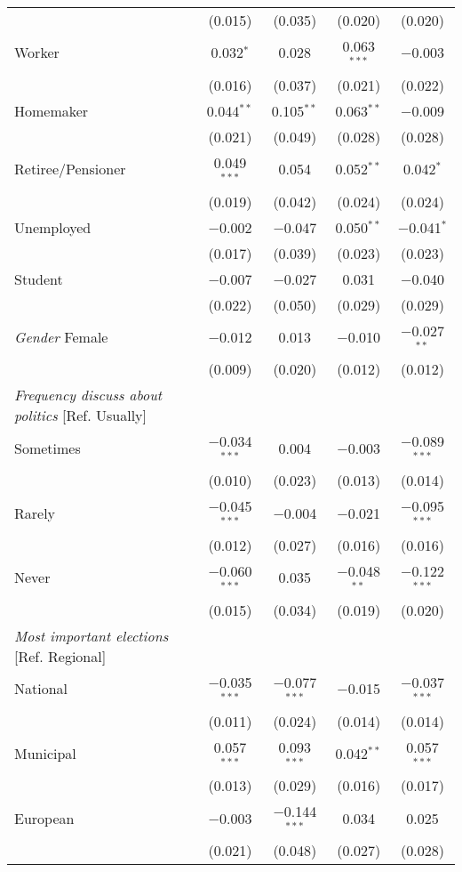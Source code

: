 \documentclass[12pt,a4paper]{article}
\begin{document}
\begin{scriptsize}
\begin{longtable}{@{\extracolsep{5pt}}lcccc}
  & (0.015) & (0.035) & (0.020) & (0.020) \\ 
Worker & 0.032$^{*}$ & 0.028 & 0.063$^{***}$ & $-$0.003 \\ 
  & (0.016) & (0.037) & (0.021) & (0.022) \\ 
Homemaker & 0.044$^{**}$ & 0.105$^{**}$ & 0.063$^{**}$ & $-$0.009 \\ 
  & (0.021) & (0.049) & (0.028) & (0.028) \\ 
Retiree/Pensioner & 0.049$^{***}$ & 0.054 & 0.052$^{**}$ & 0.042$^{*}$ \\ 
  & (0.019) & (0.042) & (0.024) & (0.024) \\ 
Unemployed & $-$0.002 & $-$0.047 & 0.050$^{**}$ & $-$0.041$^{*}$ \\ 
  & (0.017) & (0.039) & (0.023) & (0.023) \\ 
Student & $-$0.007 & $-$0.027 & 0.031 & $-$0.040 \\ 
  & (0.022) & (0.050) & (0.029) & (0.029) \\ 
{\it Gender} Female & $-$0.012 & 0.013 & $-$0.010 & $-$0.027$^{**}$ \\ 
  & (0.009) & (0.020) & (0.012) & (0.012) \\ 
{\it Frequency discuss about politics} [Ref. Usually]\\
Sometimes & $-$0.034$^{***}$ & 0.004 & $-$0.003 & $-$0.089$^{***}$ \\ 
  & (0.010) & (0.023) & (0.013) & (0.014) \\ 
Rarely & $-$0.045$^{***}$ & $-$0.004 & $-$0.021 & $-$0.095$^{***}$ \\ 
  & (0.012) & (0.027) & (0.016) & (0.016) \\ 
Never & $-$0.060$^{***}$ & 0.035 & $-$0.048$^{**}$ & $-$0.122$^{***}$ \\ 
  & (0.015) & (0.034) & (0.019) & (0.020) \\ 
{\it Most important elections} [Ref. Regional]\\
National & $-$0.035$^{***}$ & $-$0.077$^{***}$ & $-$0.015 & $-$0.037$^{***}$ \\ 
  & (0.011) & (0.024) & (0.014) & (0.014) \\ 
Municipal & 0.057$^{***}$ & 0.093$^{***}$ & 0.042$^{**}$ & 0.057$^{***}$ \\ 
  & (0.013) & (0.029) & (0.016) & (0.017) \\ 
European & $-$0.003 & $-$0.144$^{***}$ & 0.034 & 0.025 \\ 
  & (0.021) & (0.048) & (0.027) & (0.028) \\ 

\end{longtable}
\end{scriptsize}
\end{document}
